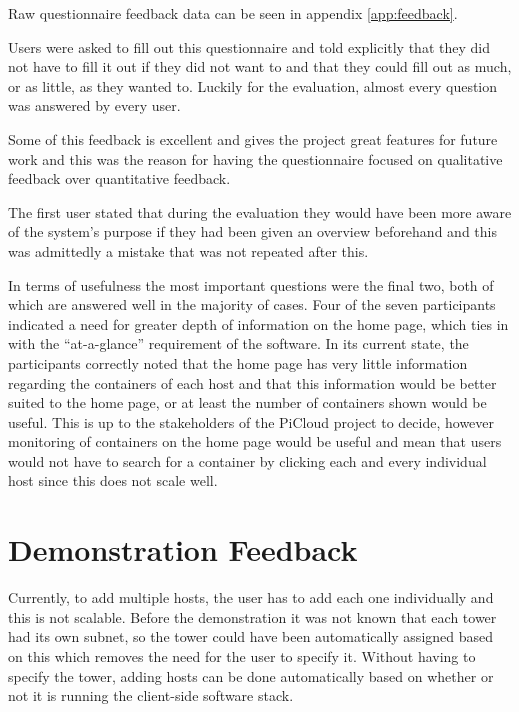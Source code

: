 Raw questionnaire feedback data can be seen in appendix \ref{app:feedback}.

Users were asked to fill out this questionnaire and told explicitly that they did not have to fill it out if they did not want to and that they could fill out as much, or as little, as they wanted to.
Luckily for the evaluation, almost every question was answered by every user.

Some of this feedback is excellent and gives the project great features for future work and this was the reason for having the questionnaire focused on qualitative feedback over quantitative feedback.

The first user stated that during the evaluation they would have been more aware of the system's purpose if they had been given an overview beforehand and this was admittedly a mistake that was not repeated after this.

In terms of usefulness the most important questions were the final two, both of which are answered well in the majority of cases.
Four of the seven participants indicated a need for greater depth of information on the home page, which ties in with the ``at-a-glance'' requirement of the software.
In its current state, the participants correctly noted that the home page has very little information regarding the containers of each host and that this information would be better suited to the home page, or at least the number of containers shown would be useful.
This is up to the stakeholders of the PiCloud project to decide, however monitoring of containers on the home page would be useful and mean that users would not have to search for a container by clicking each and every individual host since this does not scale well.

\section{Demonstration Feedback}

Currently, to add multiple hosts, the user has to add each one individually and this is not scalable.
Before the demonstration it was not known that each tower had its own subnet, so the tower could have been automatically assigned based on this which removes the need for the user to specify it.
Without having to specify the tower, adding hosts can be done automatically based on whether or not it is running the client-side software stack.
